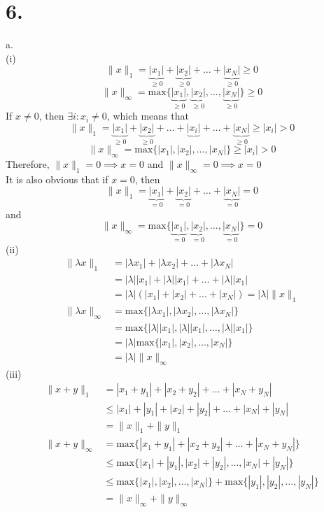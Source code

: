 \documentclass[11pt]{article}
\begin{document}
\section*{6.}
a. \\
(i) 
\[
\| x\|_1 = \underbrace{|x_1|}_{\ge 0} + \underbrace{|x_2|}_{\ge 0} + \ldots + \underbrace{|x_N|}_{\ge 0}\ge 0
\]
\[
\| x\|_\infty = \text{max}\{\underbrace{|x_1|}_{\ge 0}, \underbrace{|x_2|}_{\ge 0}, \ldots,  \underbrace{|x_N|}_{\ge 0} \} \ge 0
\]
If $x \ne 0$, then $\exists i: x_i \ne 0$, which means that 
\[
\|x\|_1 = \underbrace{|x_1|}_{\ge 0} + \underbrace{|x_2|}_{\ge 0} + \ldots + \underbrace{|x_i|} + \ldots + \underbrace{|x_N|}_{\ge 0}\ge |x_i| > 0 
\]
\[
\| x\|_\infty = \text{max}\{|x_1|, |x_2|, \ldots, |x_N|\} \ge |x_i| >0
\]
Therefore, $\|x\|_1 = 0 \implies x=0$ and $\|x\|_\infty = 0 \implies x=0$ \\
It is also obvious that if $x=0$, then
\[
\| x\|_1 = \underbrace{|x_1|}_{= 0} + \underbrace{|x_2|}_{= 0} + \ldots + \underbrace{|x_N|}_{=0}= 0
\]
and
\[
\| x\|_\infty = \text{max}\{\underbrace{|x_1|}_{= 0}, \underbrace{|x_2|}_{= 0}, \ldots,  \underbrace{|x_N|}_{= 0} \} = 0
\]
(ii)
\begin{equation*}
\begin{aligned}
\|\lambda x\|_1 &=  |\lambda x_1| + |\lambda x_2| + \ldots + |\lambda x_N| \\
&= |\lambda||x_1| + |\lambda||x_1| + \ldots + |\lambda||x_1| \\
&= |\lambda| (|x_1| + |x_2| + \ldots + |x_N|) =  |\lambda|\|x\|_1 \\
\|\lambda x\|_\infty &=  \text{max}\{|\lambda x_1| , |\lambda x_2| , \ldots , |\lambda x_N| \} \\
&= \text{max} \{|\lambda||x_1|, |\lambda||x_1|, \ldots , |\lambda||x_1| \}\\
&= |\lambda |\text{max} \{|x_1|, |x_2|, \ldots, |x_N|\} \\
&= |\lambda| \|x\|_\infty
\end{aligned}
\end{equation*}
(iii)
\begin{equation*}
\begin{aligned}
\| x+y\|_1 &= |x_1 + y_1| + |x_2 + y_2| + \ldots + |x_N + y_N| \\
& \le |x_1| + |y_1| + |x_2| + |y_2| + \ldots + |x_N| + |y_N| \\
&= \|x\|_1 + \|y\|_1 \\
\|x+y\|_\infty &=  \text{max}\{ |x_1 + y_1| + |x_2 + y_2| + \ldots + |x_N + y_N|\}\\
&\le \text{max} \{  |x_1| + |y_1|, |x_2| + |y_2|, \ldots , |x_N| + |y_N| \} \\
&\le \text{max} \{ |x_1|, |x_2|, \ldots, |x_N|\} + \text{max}\{|y_1|, |y_2|, \ldots ,|y_N|\} \\
&= \|x\|_\infty + \|y\|_\infty
\end{aligned}
\end{equation*}
\end{document}

